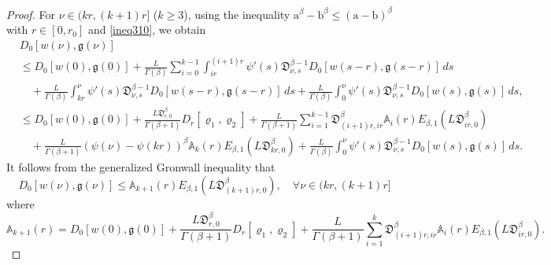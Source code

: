 \documentclass[reqno]{amsart}
\begin{document}
\begin{proof}
For $\nu \in (k r,(k+1) r]$ ($k \geq 3$), using the inequality 
$\mathrm{a}^\beta - \mathrm{b}^\beta \leq (\mathrm{a}-\mathrm{b})^\beta$ with 
$ r \in [0,r_0]$ and \eqref{ineq310}, we obtain
\begin{align*}
&D_0[ w(\nu ), \mathfrak{g}(\nu )] \\
&\leq  D_0[ w(0), \mathfrak{g}(0)]+\frac{ L}{\Gamma(\beta)} 
\sum_{i=0}^{k-1} \int_{i r}^{(i+1) r} \psi'(s)\mathfrak{D}_{\nu ,s}^{\beta-1} 
 D_0[ w(s- r), \mathfrak{g}(s- r)]\,ds \\
&\quad +\frac{ L}{\Gamma(\beta)} \int_{k r}^{\nu } \psi'(s)
 \mathfrak{D}_{\nu ,s}^{\beta-1} D_0[ w(s- r), \mathfrak{g}(s- r)]\,ds 
 +\frac{ L}{\Gamma(\beta)} \int_0^{\nu } \psi'(s)\mathfrak{D}_{\nu ,s}^{\beta-1}
  D_0[ w(s), \mathfrak{g}(s)]\,ds, \\
&\leq  D_0[ w(0), \mathfrak{g}(0)]+\frac{ L\mathfrak{D}_{ r,0}^{\beta}}{\Gamma(\beta+1)} 
 D_{ r}[\varrho_{1}, \varrho_{2}] 
 +\frac{ L}{\Gamma(\beta+1)} \sum_{i=1}^{k-1}\mathfrak{D}_{(i+1) r,i r}^{\beta} 
 \mathbb{A}_{i}( r) E_{\beta, 1}( L\mathfrak{D}_{i r,0}^{\beta}) \\
&\quad +\frac{ L}{\Gamma(\beta+1)}(\psi(\nu )-\psi(k r))^{\beta} \mathbb{A}_{k}
 ( r) E_{\beta, 1}( L\mathfrak{D}_{k r,0}^{\beta})
 +\frac{ L}{\Gamma(\beta)} \int_0^{\nu } \psi'(s)\mathfrak{D}_{\nu ,s}^{\beta-1} 
 D_0[ w(s), \mathfrak{g}(s)]\,ds.
\end{align*}
It follows from the generalized Gronwall inequality that
\begin{equation}\label{ineq312}
D_0[ w(\nu ), \mathfrak{g}(\nu )] 
\leq \mathbb{A}_{k+1}( r) E_{\beta, 1}( L\mathfrak{D}_{(k+1) r,0}^{\beta}), 
\quad \forall \nu \in(k r,(k+1) r] 
\end{equation}
where
\begin{equation} \label{eq313}
\mathbb{A}_{k+1}( r)=  D_0[ w(0), \mathfrak{g}(0)]
+\frac{ L\mathfrak{D}_{ r,0}^{\beta}}{\Gamma(\beta+1)} D_{ r}[\varrho_{1},
\varrho_{2}] +\frac{ L}{\Gamma(\beta+1)}
 \sum_{i=1}^{k}\mathfrak{D}_{(i+1) r,i r}^{\beta} \mathbb{A}_{i}( r) E_{\beta, 1}
 ( L\mathfrak{D}_{i r,0}^{\beta}) .
\end{equation}


\end{proof}
\end{document}
